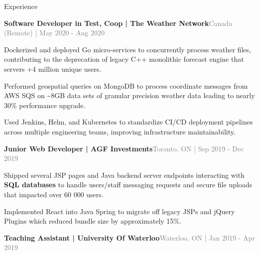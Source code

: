 \documentclass[hidelinks]{resume} %
\begin{document}
\begin{rSection}{Experience}
\begin{rSubsection}{\textbf{Software Developer in Test, Coop | The Weather Network}}{\textcolor{gray}{\small Canada (Remote) | May 2020 - Aug 2020}}{}
        \begin{bulletpoints}
            \vspace{-.10cm}
            \item Dockerized and deployed Go micro-services to concurrently process weather files, contributing to the deprecation of legacy C++ monolithic forecast engine that servers +4 million unique users.
             \vspace{-.13cm}
            \item Performed geospatial queries on MongoDB to process coordinate messages from AWS SQS on \textasciitilde 8GB data sets of granular precision weather data leading to nearly 30\% performance upgrade.
            \vspace{-.13cm}
             \item Used Jenkins, Helm, and Kubernetes to standardize CI/CD deployment pipelines across multiple engineering teams, improving infrastructure maintainability.
             \vspace{-.10cm}
        \end{bulletpoints}
\end{rSubsection}
\begin{rSubsection}{\textbf{Junior Web Developer | AGF Investments}}{\textcolor{gray}{\small Toronto, ON | Sep 2019 - Dec 2019}}{}
        \par
        \begin{bulletpoints}
            \vspace{-.10cm}
            \item Shipped several JSP pages and Java backend server endpoints interacting with \textbf{SQL databases} to handle users/staff messaging requests and secure file uploads that impacted over 60 000 users.
            \vspace{-.13cm}
            \item Implemented React into Java Spring to migrate off legacy JSPs and jQuery Plugins which reduced bundle size by approximately 15\%.
             \vspace{-.10cm}
        \end{bulletpoints}
\end{rSubsection}
\begin{rSubsection}{\textbf{Teaching Assistant | University Of Waterloo}}{\textcolor{gray}{\small Waterloo, ON | Jan 2019 - Apr 2019}}{}


\end{rSubsection}
\end{rSection}
\end{document}
